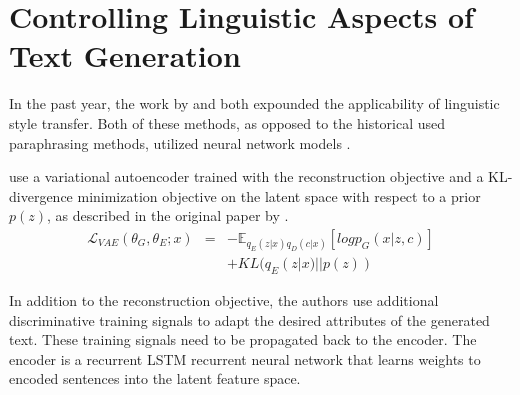 \section{Controlling Linguistic Aspects of Text Generation}

In the past year, the work by \citep{hu2017toward} and \citep{ficler2017controlling} both expounded the applicability of linguistic style transfer. Both of these methods, as opposed to the historical used paraphrasing methods, utilized neural network models \citep{lecun2015deep}.

\citep{hu2017toward} use a variational autoencoder trained with the reconstruction objective and a KL-divergence minimization objective on the latent space with respect to a prior $p(z)$, as described in the original paper by \cite{kingma2013auto}.
\begin{eqnarray*}
	\mathcal{L}_{VAE}(\theta_G, \theta_E; x) &=&
	- \mathbb{E}_{q_E(z|x)q_D(c|x)}[log p_G(x|z,c)] \\ & &
	+ KL(q_E(z|x)||p(z))
\end{eqnarray*}

In addition to the reconstruction objective, the authors use additional discriminative training signals to adapt the desired attributes of the generated text. These training signals need to be propagated back to the encoder. The encoder is a recurrent LSTM recurrent neural network that learns weights to encoded sentences into the latent feature space.
